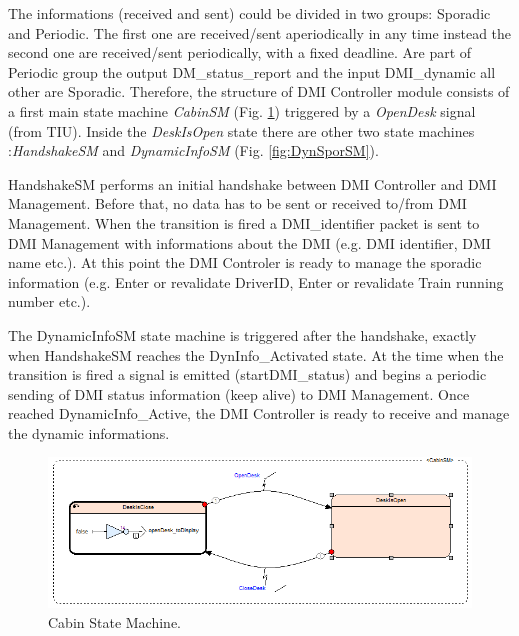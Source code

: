   The informations (received and sent) could be divided in two groups: Sporadic and Periodic. The first one are received/sent aperiodically in any time instead the second one are received/sent periodically, with a fixed deadline. Are part of Periodic group the output DM\_status\_report and the input DMI\_dynamic all other are Sporadic. Therefore, the structure of DMI Controller module consists of a first main state machine \textit{CabinSM} (Fig. \ref{fig:CabinSM}) triggered by  a \textit{OpenDesk} signal (from TIU). Inside the \textit{DeskIsOpen} state there are other two state machines :\textit{HandshakeSM} and \textit{DynamicInfoSM} (Fig. \ref{fig:DynSporSM}).
  
  HandshakeSM performs an initial handshake between DMI Controller and DMI Management. Before that, no data has to be sent or received to/from DMI Management. When the transition is fired a DMI\_identifier packet is sent to DMI Management with informations about the DMI (e.g. DMI identifier, DMI name etc.). At this point the DMI Controler is ready to manage the sporadic information (e.g. Enter or revalidate DriverID, Enter or revalidate Train running number etc.). 
  
  The DynamicInfoSM state machine is triggered after the handshake, exactly when  HandshakeSM reaches the  DynInfo\_Activated state. At the time when the transition is fired a signal is emitted (startDMI\_status) and begins a periodic sending of DMI status information (keep alive) to DMI Management. Once reached DynamicInfo\_Active, the DMI Controller is ready to receive and manage the dynamic informations.
  
   \begin{figure} 
      	\centering
      	\includegraphics[scale=0.7]{images/CabinSM}
      	\caption{Cabin State Machine.}
      	\label{fig:CabinSM}
   \end{figure}
      

